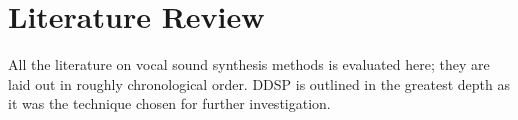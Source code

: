 \chapter{Literature Review}

\begin{center}
  \begin{minipage}{0.5\textwidth}
    \begin{small}
      All the literature on vocal sound synthesis methods is evaluated here; they are laid out in roughly chronological order. DDSP is outlined in the greatest depth as it was the technique chosen for further investigation.
    \end{small}
  \end{minipage}
  \vspace{0.5cm}
\end{center}







